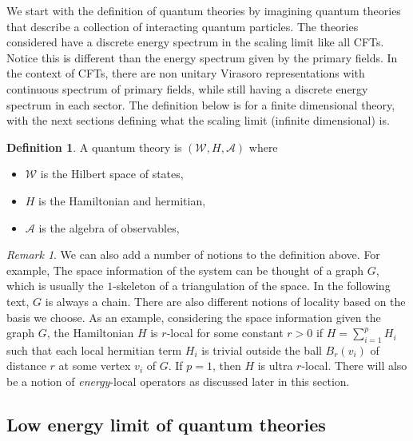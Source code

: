 \documentclass[twoside,11pt,titlepage]{amsart}
\renewcommand{\=}[1]{\stackrel{#1}{=}} %
\theoremstyle{definition}
\newtheorem{dfn}{Definition}
\theoremstyle{remark}
\newtheorem{rmk}{Remark}
\begin{document}
We start with the definition of quantum theories by imagining quantum theories that describe a collection of interacting quantum particles. The theories considered have a discrete energy spectrum in the scaling limit like all CFTs. Notice this is different than the energy spectrum given by the primary fields. In the context of CFTs, there are non unitary Virasoro representations with continuous spectrum of primary fields, while still having a discrete energy spectrum in each sector. The definition below is for a finite dimensional theory, with the next sections defining what the scaling limit (infinite dimensional) is. 
\begin{dfn}
A quantum theory is $(\mathcal{W}, H, \mathcal{A})$ where
\begin{itemize}
    \item $\mathcal{W}$ is the Hilbert space of states,
    \item $H$ is the Hamiltonian and hermitian,
    \item $\mathcal{A}$ is the algebra of observables,
\end{itemize} 
\end{dfn}
\label{dfn2}
\begin{rmk}\label{rmk1}
We can also add a number of notions to the definition above. For example, The space information of the system can be thought of a graph $G$, which is usually the $1$-skeleton of a triangulation of the space. In the following text, $G$ is always a chain. There are also different notions of locality based on the basis we choose. As an example, considering the space information given the graph $G$, the Hamiltonian $H$ is $r$-local for some constant $r>0$ if $H=\sum_{i=1}^p H_i$ such that each local hermitian term $H_i$ is trivial outside the ball $B_r(v_i)$ of distance $r$ at some vertex $v_i$ of $G$. If $p=1$, then $H$ is ultra $r$-local. There will also be a notion of \textit{energy}-local operators as discussed later in this section.
\end{rmk}
\subsection{Low energy limit of quantum theories}\label{2.1}
\end{document}
